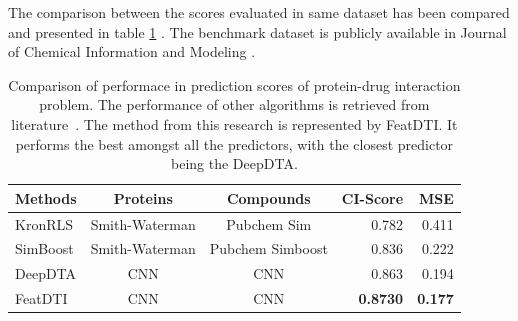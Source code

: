 The comparison between the scores evaluated in same dataset has been compared and presented in table \ref{table:results_comparison} \citep{ozturk2018deepdta}. The benchmark dataset is publicly available in Journal of Chemical Information and Modeling \citep{Tang2013,He2017}.

\begin{table}[H] 
    \centering
    \caption[Results Comparison]{Comparison of performace in prediction scores of protein-drug interaction problem. The performance of other algorithms is retrieved from literature~\citep{ozturk2018deepdta}. The method from this research is represented by FeatDTI. It performs the best amongst all the predictors, with the closest predictor being the DeepDTA.}
    \label{table:results_comparison}
    \begin{tabular}{|l|c|c|r|r|}
        \hline
        
        Methods & Proteins & Compounds & CI-Score & MSE \\ \hline
        KronRLS & Smith-Waterman & Pubchem Sim & 0.782 & 0.411 \\ \hline
        SimBoost & Smith-Waterman & Pubchem Simboost & 0.836 & 0.222 \\ \hline
        DeepDTA & CNN & CNN & 0.863 & 0.194 \\ \hline
        FeatDTI & CNN & CNN & \textbf{0.8730} & \textbf{0.177} \\ \hline
        
        \end{tabular}
\end{table}

